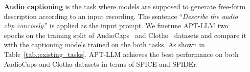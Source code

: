 \begin{table}[t]
\centering
\caption{Performance comparison in audio captioning tasks. $\uparrow$ indicates the higher number, the better performance.}
\label{tab.:existing_tasks}
\vspace{1em}
\vspace{-0.3cm}
\end{table}

\textbf{Audio captioning} is the task where models are supposed to generate free-form description according to an input recording. The sentence ``\textit{Describe the audio clip concisely}.'' is applied as the input prompt. We finetune APT-LLM two epochs on the training split of AudioCaps~\citep{kim_audiocaps_2019} and Clotho~\citep{drossos_clotho_2020} datasets and compare it with the captioning models trained on the both tasks. As shown in Table~\ref{tab.:existing_tasks}, APT-LLM achieves the best performance on both AudioCaps and Clotho datasets in terms of SPICE and SPIDEr.

